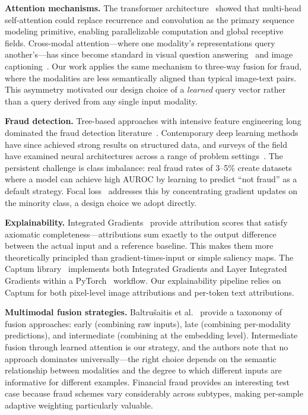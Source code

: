 \documentclass[10pt,conference,letterpaper]{IEEEtran}
\begin{document}
\textbf{Attention mechanisms.} The transformer architecture~\cite{Attention} showed that
multi-head self-attention could replace recurrence and convolution as the primary
sequence modeling primitive, enabling parallelizable computation and global receptive
fields. Cross-modal attention---where one modality's representations query
another's---has since become standard in visual question answering~\cite{VQA} and image
captioning~\cite{Captioning}. Our work applies the same mechanism to three-way fusion
for fraud, where the modalities are less semantically aligned than typical image-text
pairs. This asymmetry motivated our design choice of a \textit{learned} query vector
rather than a query derived from any single input modality.

\textbf{Fraud detection.} Tree-based approaches with intensive feature engineering long
dominated the fraud detection literature~\cite{FICO}. Contemporary deep learning methods
have since achieved strong results on structured data, and surveys of the field have
examined neural architectures across a range of problem settings~\cite{FraudDL}. The
persistent challenge is class imbalance: real fraud rates of 3--5\% create datasets
where a model can achieve high AUROC by learning to predict ``not fraud'' as a default
strategy. Focal loss~\cite{FocalLoss} addresses this by concentrating gradient updates
on the minority class, a design choice we adopt directly.

\textbf{Explainability.} Integrated Gradients~\cite{IntGradients} provide attribution
scores that satisfy axiomatic completeness---attributions sum exactly to the output
difference between the actual input and a reference baseline. This makes them more
theoretically principled than gradient-times-input or simple saliency maps. The Captum
library~\cite{Captum} implements both Integrated Gradients and Layer Integrated
Gradients within a PyTorch~\cite{PyTorch} workflow. Our explainability pipeline relies
on Captum for both pixel-level image attributions and per-token text attributions.

\textbf{Multimodal fusion strategies.} Baltru\v{s}aitis et al.~\cite{MultimodalSurvey}
provide a taxonomy of fusion approaches: early (combining raw inputs), late (combining
per-modality predictions), and intermediate (combining at the embedding level).
Intermediate fusion through learned attention is our strategy, and the authors note that
no approach dominates universally---the right choice depends on the semantic relationship
between modalities and the degree to which different inputs are informative for different
examples. Financial fraud provides an interesting test case because fraud schemes vary
considerably across subtypes, making per-sample adaptive weighting particularly
valuable.
\end{document}
